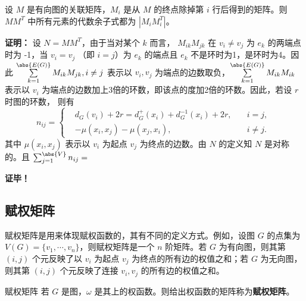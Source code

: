 \begin{theorem}{}
设 $M$ 是有向图的关联矩阵，$M_i$ 是从 $M$ 的终点除掉第 $i$ 行后得到的矩阵。则 $MM^T$ 中所有元素的代数余子式都为 $|M_iM_i^T|$。

\end{theorem}
\textbf{证明：}
设 $N=MM^T$，由于当对某个 $k$ 而言， $M_{ik}M_{jk}$ 在 $v_i\neq v_j$ 为 $e_k$ 的两端点时为 -1，当 $v_i=v_j$ （即 $i=j$）为 $e_k$ 的端点且 $e_k$ 不是环时为1，是环时为4。因此 $\sum\limits_{k=1}^{\abs{E(G)}}M_{ik}M_{jk},i\neq j$ 表示以 $v_i,v_j$ 为端点的边数取负，$\sum\limits_{k=1}^{\abs{E(G)}}M_{ik}M_{ik}$ 表示以 $v_i$ 为端点的边数加上3倍的环数，即该点的度加2倍的环数。因此，若设 $r$ 时图的环数， 则有
\begin{equation}
n_{ij}=\left\{\begin{aligned}
&d_G(v_i)+2r=d_G^+(x_i)+d_G^{-1}(x_i)+2r,\quad &i=j,\\
&-\mu(x_i,x_j)-\mu(x_j,x_i),\quad &i\neq j.
\end{aligned}\right.~
\end{equation}
其中 $\mu(x_i,x_j)$ 表示以 $v_i$ 为起点 $v_j$ 为终点的边数。由 $N$ 的定义知 $N$ 是对称的。且 $\sum_{j=1}^{\abs{V}}n_{ij}=$



\textbf{证毕！}


\subsection{赋权矩阵}

赋权矩阵是用来体现赋权函数的，其有不同的定义方式。例如，设图 $G$ 的点集为 $V(G)=\{v_1,\cdots,v_n\}$，则赋权矩阵是一个 $n$ 阶矩阵。若 $G$ 为有向图，则其第 $(i,j)$ 个元反映了以 $v_i$ 为起点 $v_j$ 为终点的所有边的权值之和；若 $G$ 为无向图，则其第 $(i,j)$ 个元反映了连接 $v_i,v_j$ 的所有边的权值之和。
\begin{definition}{赋权矩阵}
若 $G$ 是图，$\omega$ 是其上的权函数。则给出权函数的矩阵称为\textbf{赋权矩阵}。
\end{definition}









